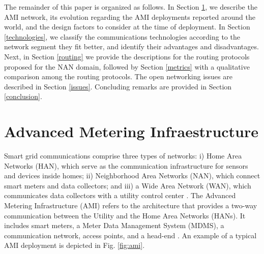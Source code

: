 \documentclass[11pt,draftclsnofoot,onecolumn]{IEEEtran}
\begin{document}

The remainder of this paper is organized as follows. In Section \ref{ami}, we describe the AMI network, its evolution regarding the AMI deployments reported around the world, and the design factors to consider at the time of deployment. In Section \ref{technologies}, we classify the communications technologies according to the network segment they fit better, and identify their advantages and disadvantages. Next, in Section \ref{routing} we provide the descriptions for the routing protocols proposed for the NAN domain, followed by Section \ref{metrics} with a qualitative comparison among the routing protocols. The open networking issues are described in Section \ref{issues}. Concluding remarks are provided in Section \ref{conclusion}.

\section{Advanced Metering Infraestructure}\label{ami}

Smart grid communications comprise three types of networks: i) Home Area Networks (HAN), which serve as the communication infrastructure for sensors and devices inside homes; ii) Neighborhood Area Networks (NAN), which connect smart meters and data collectors; and iii) a Wide Area Network (WAN), which communicates data collectors with a utility control center  \cite{Tang2010}. The Advanced Metering Infrastructure (AMI) refers to the architecture that provides a two-way communication between the Utility and the Home Area Networks (HANs). It includes smart meters, a Meter Data Management System (MDMS), a communication network, access points, and a head-end  \cite{Wang2011b} \cite{Bennett2008}. An example of a typical AMI deployment is depicted in Fig. \ref{fig:ami}.
\end{document}
